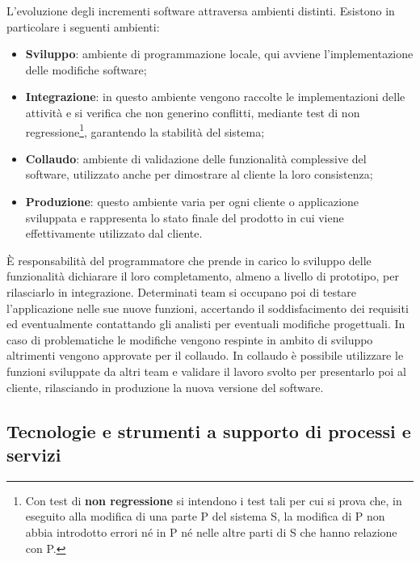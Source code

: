 	L'evoluzione degli incrementi software attraversa ambienti distinti.%
	Esistono in particolare i seguenti ambienti:
	\begin{itemize}
		\item \textbf{Sviluppo}: ambiente di programmazione locale, qui avviene l'implementazione delle modifiche software;
		\item \textbf{Integrazione}: in questo ambiente vengono raccolte le implementazioni delle attività e si verifica che non generino conflitti, mediante test di non regressione\footnote{Con test di \textbf{non regressione} si intendono i test tali per cui si prova che, in eseguito alla modifica di una parte P del sistema S, la modifica di P non abbia introdotto errori né in P né nelle altre parti di S che hanno relazione con P.}, garantendo la stabilità del sistema;
		\item \textbf{Collaudo}: ambiente di validazione delle funzionalità complessive del software, utilizzato anche per dimostrare al cliente la loro consistenza;
		\item \textbf{Produzione}: questo ambiente varia per ogni cliente o applicazione sviluppata e rappresenta lo stato finale del prodotto in cui viene effettivamente utilizzato dal cliente.
	\end{itemize}	
	
	È responsabilità del programmatore che prende in carico lo sviluppo delle funzionalità dichiarare il loro completamento, almeno a livello di prototipo, per rilasciarlo in integrazione. Determinati team si occupano poi di testare l'applicazione nelle sue nuove funzioni, accertando il soddisfacimento dei requisiti ed eventualmente contattando gli analisti per eventuali modifiche progettuali. In caso di problematiche le modifiche vengono respinte in ambito di sviluppo altrimenti vengono approvate per il collaudo. In collaudo è possibile utilizzare le funzioni sviluppate da altri team e validare il lavoro svolto per presentarlo poi al cliente, rilasciando in produzione la nuova versione del software.
	
	\subsection{Tecnologie e strumenti a supporto di processi e servizi}

